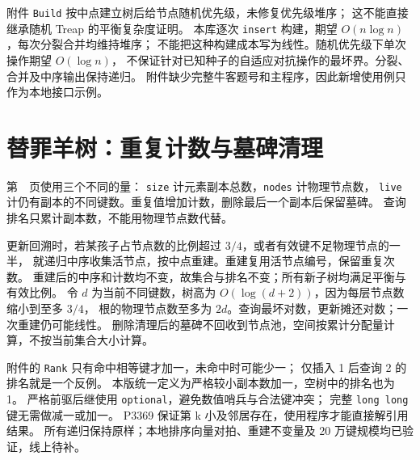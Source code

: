 附件 \texttt{Build} 按中点建立树后给节点随机优先级，未修复优先级堆序；
这不能直接继承随机 Treap 的平衡复杂度证明。
本库逐次 \texttt{insert} 构建，期望 $O(n\log n)$，每次分裂合并均维持堆序；
不能把这种构建成本写为线性。随机优先级下单次操作期望 $O(\log n)$，
不保证针对已知种子的自适应对抗操作的最坏界。分裂、合并及中序输出保持递归。
附件缺少完整牛客题号和主程序，因此新增使用例只作为本地接口示例。

\section{替罪羊树：重复计数与墓碑清理}\label{knowledge-scapegoat}
第~\pageref{compact-ScapegoatTree}~页使用三个不同的量：
\texttt{size} 计元素副本总数，\texttt{nodes} 计物理节点数，
\texttt{live} 计仍有副本的不同键数。重复值增加计数，删除最后一个副本后保留墓碑。
查询排名只累计副本数，不能用物理节点数代替。

更新回溯时，若某孩子占节点数的比例超过 $3/4$，或者有效键不足物理节点的一半，
就递归中序收集活节点，按中点重建。重建复用活节点编号，保留重复次数。
重建后的中序和计数均不变，故集合与排名不变；所有新子树均满足平衡与有效比例。
令 $d$ 为当前不同键数，树高为 $O(\log(d+2))$，因为每层节点数缩小到至多 $3/4$，
根的物理节点数至多为 $2d$。查询最坏对数，更新摊还对数；一次重建仍可能线性。
删除清理后的墓碑不回收到节点池，空间按累计分配量计算，不按当前集合大小计算。

附件的 \texttt{Rank} 只有命中相等键才加一，未命中时可能少一；
仅插入 1 后查询 2 的排名就是一个反例。
本版统一定义为严格较小副本数加一，空树中的排名也为 1。
严格前驱后继使用 \texttt{optional}，避免数值哨兵与合法键冲突；
完整 \texttt{long long} 键无需做减一或加一。
P3369 保证第 k 小及邻居存在，使用程序才能直接解引用结果。
所有递归保持原样；本地排序向量对拍、重建不变量及 20 万键规模均已验证，线上待补。

